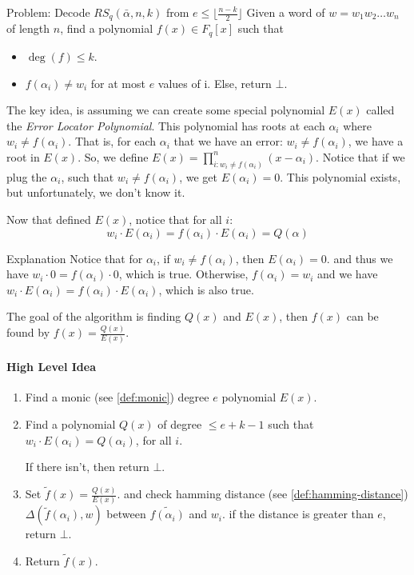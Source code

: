 \begin{bclogo}[logo=\bcattention,noborder=true]{Problem: Decode 
    $RS_q(\bar{\alpha},n,k)$ from $e\le \lfloor\frac{n-k}{2}\rfloor$}
Given a word of $w=w_1w_2\dots w_n$ of length $n$, 
find a polynomial $f(x)\in F_q[x]$ such that
\begin{itemize}
    \item $\deg(f)\le k$.
    \item $f(\alpha_i)\ne w_i$ for at most $e$ values of i. Else, return $\bot$.
\end{itemize}

\end{bclogo}

The key idea, is assuming we can create some special polynomial $E(x)$ called
 the \emph{Error Locator Polynomial}.
This polynomial has roots at each $\alpha_i$ where $w_i\ne f(\alpha_i)$. That is, 
for each $\alpha_i$  that we have an error: $w_i\ne f(\alpha_i)$, we have a root in $E(x)$.
So, we define $ E(x) = \prod_{i:w_i\ne f(\alpha_i)}^{n} (x-\alpha_i)$.
Notice that if we plug the $\alpha_i$, such that $w_i\ne f(\alpha_i)$,
 we get $E(\alpha_i)=0$.
This polynomial exists, but unfortunately, we don't know it. 

Now that defined $E(x)$, notice that for all $i$:
$$ w_i\cdot E(\alpha_i) = f(\alpha_i)\cdot E(\alpha_i)= Q(\alpha)$$


\begin{bclogo}[logo=\bcinfo,noborder=true]{Explanation}
    Notice that for $\alpha_i$, if $w_i\ne f(\alpha_i)$, then $E(\alpha_i)=0$.
    and thus we have $w_i\cdot 0 = f(\alpha_i)\cdot 0$, which is true.
    Otherwise, $f(\alpha_i)=w_i$ and we have
     $w_i\cdot E(\alpha_i) = f(\alpha_i)\cdot E(\alpha_i)$, which is also true.
\end{bclogo}

The goal of the algorithm is finding $Q(x)$ and $E(x)$,
 then $f(x)$ can be found by $f(x)=\frac{Q(x)}{E(x)}$.

\paragraph{High Level Idea}
\begin{enumerate}
    \item Find a monic (see \autoref{def:monic}) degree $e$ polynomial $E(x)$.
    \item Find a polynomial $Q(x)$ of degree $\le e+k-1$ such 
    that $w_i\cdot E(\alpha_i)=Q(\alpha_i)$, for all $i$.

    If there isn't, then return $\bot$.
    \item Set $\tilde{f}(x)=\frac{Q(x)}{E(x)}$. and check hamming distance 
    (see \autoref{def:hamming-distance}) $\Delta(\tilde{f}(\alpha_i),w)$ 
    between $\tilde{f(\alpha_i)}$ and $w_i$.
    if the distance is greater than $e$, return $\bot$.
    \item Return $\tilde{f}(x)$.
\end{enumerate}


